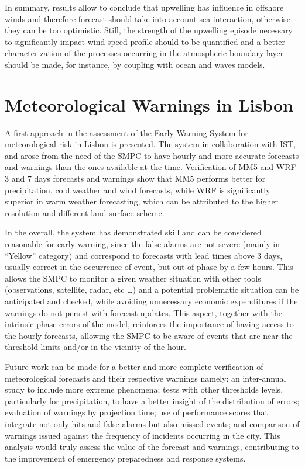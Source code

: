 In summary, results allow to conclude that upwelling has influence in offshore winds and therefore forecast should take into account sea interaction, otherwise they can be too optimistic. Still, the strength of the upwelling episode necessary to significantly impact wind speed profile should to be quantified and a better characterization of the processes occurring in the atmospheric boundary layer should be made, for instance, by coupling with ocean and waves models. 

\section{Meteorological Warnings in Lisbon}

A first approach in the assessment of the Early Warning System for meteorological risk in Lisbon is presented. The system in collaboration with IST, and arose from the need of the SMPC to have hourly and more accurate forecasts and warnings than the ones available at the time. Verification of MM5 and WRF 3 and 7 days forecasts and warnings show that MM5 performs better for precipitation, cold weather and wind forecasts, while WRF is significantly superior in warm weather forecasting, which can be attributed to the higher resolution and different land surface scheme. 

In the overall, the system has demonstrated skill and can be considered reasonable for early warning, since the false alarms are not severe (mainly in “Yellow” category) and correspond to forecasts with lead times above 3 days, usually correct in the occurrence of event, but out of phase by a few hours. This allows the SMPC to monitor a given weather situation with other tools (observations, satellite, radar, etc \ldots) and a potential problematic situation can be anticipated and checked, while avoiding unnecessary economic expenditures if the warnings do not persist with forecast updates. This aspect, together with the intrinsic phase errors of the model, reinforces the importance of having access to the hourly forecasts, allowing the SMPC to be aware of events that are near the threshold limits and/or in the vicinity of the hour.

Future work can be made for a better and more complete verification of meteorological forecasts and their respective warnings namely: an inter-annual study to include more extreme phenomena; tests with other thresholds levels, particularly for precipitation, to have a better insight of the distribution of errors; evaluation of warnings by projection time; use of performance scores that integrate not only hits and false alarms but also missed events; and comparison of warnings issued against the frequency of incidents occurring in the city. This analysis would truly assess the value of the forecast and warnings, contributing to the improvement of emergency preparedness and response systems.

